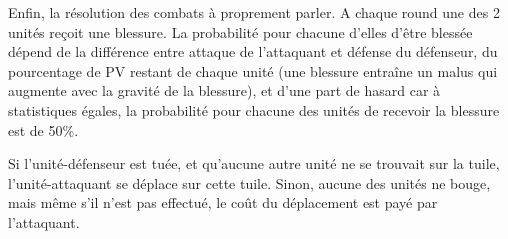 Enfin, la résolution des combats à proprement parler. A chaque round une des 2 unités reçoit une blessure. La probabilité pour chacune d'elles d'être blessée dépend de la différence entre attaque de l'attaquant et défense du défenseur, du pourcentage de PV restant de chaque unité (une blessure entraîne un malus qui augmente avec la gravité de la blessure), et d'une part de hasard car à statistiques égales, la probabilité pour chacune des unités de recevoir la blessure est de 50\%.\newline

Si l'unité-défenseur est tuée, et qu'aucune autre unité ne se trouvait sur la tuile, l'unité-attaquant se déplace sur cette tuile. Sinon, aucune des unités ne bouge, mais même s'il n'est pas effectué, le coût du déplacement est payé par l'attaquant. 